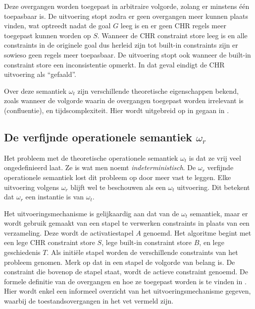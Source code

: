 Deze overgangen worden toegepast in arbitraire volgorde, zolang er minstens \'e\'en toepasbaar is. De uitvoering stopt zodra er geen overgangen meer kunnen plaats vinden, wat optreedt nadat de goal $G$ leeg is en er geen CHR regels meer toegepast kunnen worden op $S$. Wanneer de CHR constraint store leeg is en alle constraints in de originele goal dus herleid zijn tot built-in constraints zijn er sowieso geen regels meer toepasbaar. De uitvoering stopt ook wanneer de built-in constraint store een inconsistentie opmerkt. In dat geval eindigt de CHR uitvoering als ``gefaald''.

Over deze semantiek $\omega_t$ zijn verschillende theoretische eigenschappen bekend, zoals wanneer de volgorde waarin de overgangen toegepast worden irrelevant is (confluentie), en tijdscomplexiteit. Hier wordt uitgebreid op in gegaan in \cite{tomsphdthesis}.

\subsection{De verfijnde operationele semantiek $\omega_r$} \label{sec:omegar}

Het probleem met de theoretische operationele semantiek $\omega_t$ is dat ze vrij veel ongedefinieerd laat. Ze is wat men noemt {\em indeterministisch}. De $\omega_r$ verfijnde operationele semantiek lost dit probleem op door meer vast te leggen. Elke uitvoering volgens $\omega_r$ blijft wel te beschouwen als een $\omega_t$ uitvoering. Dit betekent dat $\omega_r$ een instantie is van $\omega_t$. 

Het uitvoeringsmechanisme is gelijkaardig aan dat van de $\omega_t$ semantiek, maar er wordt gebruik gemaakt van een stapel te verwerken constraints in plaats van een verzameling. Deze wordt de activatiestapel $A$ genoemd. Het algoritme begint met een lege CHR constraint store $S$, lege built-in constraint store $B$, en lege geschiedenis $T$. Als initi\"ele stapel worden de verschillende constraints van het probleem genomen. Merk op dat in een stapel de volgorde van belang is. De constraint die bovenop de stapel staat, wordt de actieve constraint genoemd. De formele definitie van de overgangen en hoe ze toegepast worden is te vinden in \cite{tomsphdthesis}. Hier wordt enkel een informeel overzicht van het uitvoeringsmechanisme gegeven, waarbij de toestandsovergangen in het vet vermeld zijn.

